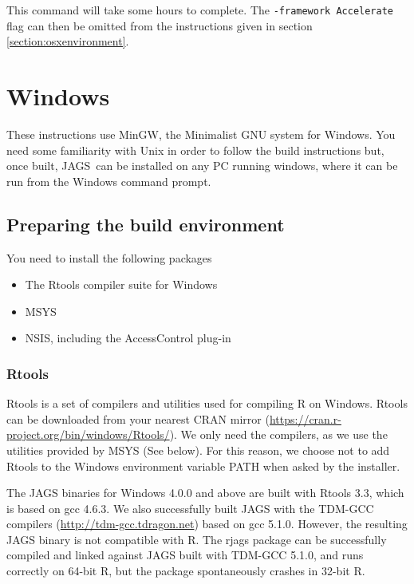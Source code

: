 \documentclass[11pt, a4paper, titlepage]{article}
\newcommand{\JAGS}{\textsf{JAGS}}
\newcommand{\code}[1]{{\bgroup{\normalfont\ttfamily #1}\egroup}}
\begin{document}
This command will take some hours to complete.  The \texttt{-framework Accelerate} flag can
then be omitted from the instructions given in section \ref{section:osxenvironment}.



\clearpage
\section{Windows}
\label{section:windows}

These instructions use MinGW, the Minimalist GNU system for Windows.
You need some familiarity with Unix in order to follow the build
instructions but, once built, \JAGS\ can be installed on any PC
running windows, where it can be run from the Windows command prompt.

\subsection{Preparing the build environment}

You need to install the following packages
\begin{itemize}
\item The Rtools compiler suite for Windows
\item MSYS  
\item NSIS, including the AccessControl plug-in  
\end{itemize}

\subsubsection{Rtools}

Rtools is a set of compilers and utilities used for compiling R on
Windows. Rtools can be downloaded from your nearest CRAN mirror
(\url{https://cran.r-project.org/bin/windows/Rtools/}).  We only need
the compilers, as we use the utilities provided by MSYS (See below).
For this reason, we choose not to add Rtools to the Windows environment
variable \code{PATH} when asked by the installer.

The JAGS binaries for Windows 4.0.0 and above are built with Rtools
3.3, which is based on gcc 4.6.3. We also successfully built JAGS with
the TDM-GCC compilers (\url{http://tdm-gcc.tdragon.net}) based on gcc
5.1.0. However, the resulting JAGS binary is not compatible with
R. The rjags package can be successfully compiled and linked against
JAGS built with TDM-GCC 5.1.0, and runs correctly on 64-bit R, but
the package spontaneously crashes in 32-bit R.
\end{document}
